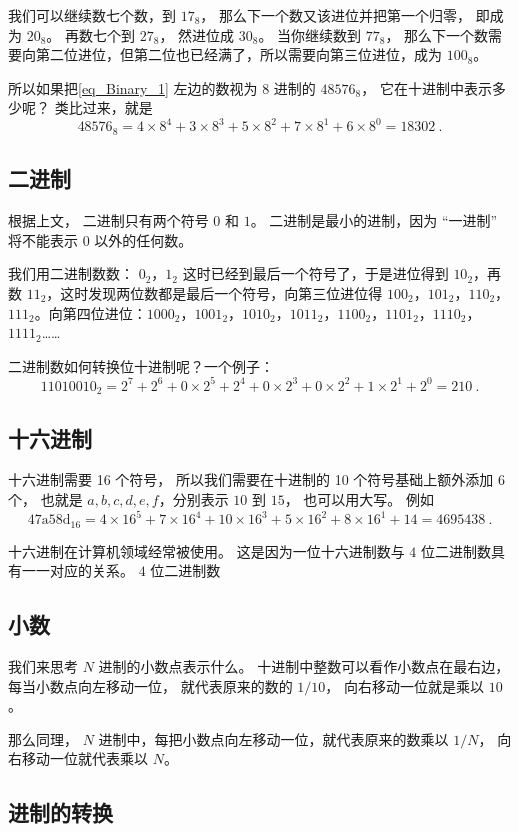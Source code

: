 我们可以继续数七个数，到 $17_\text{8}$， 那么下一个数又该进位并把第一个归零， 即成为 $20_\text{8}$。 再数七个到 $27_\text{8}$， 然进位成 $30_\text{8}$。 当你继续数到 $77_\text{8}$， 那么下一个数需要向第二位进位，但第二位也已经满了，所以需要向第三位进位，成为 $100_\text{8}$。

所以如果把\autoref{eq_Binary_1} 左边的数视为 $8$ 进制的 $48576_\text{8}$， 它在十进制中表示多少呢？ 类比过来，就是
\begin{equation}
48576_\text{8} = 4\times 8^{4} + 3\times 8^{3} + 5\times 8^{2} + 7\times 8^1 + 6\times 8^0 = 18302~.
\end{equation}

\subsection{二进制}
根据上文， 二进制只有两个符号 $0$ 和 $1$。 二进制是最小的进制，因为 “一进制” 将不能表示 $0$ 以外的任何数。

我们用二进制数数： $0_\text{2}$，$1_\text{2}$ 这时已经到最后一个符号了，于是进位得到 $10_\text{2}$，再数 $11_\text{2}$，这时发现两位数都是最后一个符号，向第三位进位得 $100_\text{2}$，$101_\text{2}$，$110_\text{2}$，$111_\text{2}$。向第四位进位：$1000_\text{2}$，$1001_\text{2}$，$1010_\text{2}$，$1011_\text{2}$，$1100_\text{2}$，$1101_\text{2}$，$1110_\text{2}$，$1111_\text{2}$……

二进制数如何转换位十进制呢？一个例子：
\begin{equation}
11010010_\text{2} = 2^7 + 2^6 + 0\times 2^5 + 2^4 + 0\times 2^3 + 0 \times 2^2 + 1\times 2^1 + 2^0 = 210~.
\end{equation}


\subsection{十六进制}
十六进制需要 16 个符号， 所以我们需要在十进制的 10 个符号基础上额外添加 6 个， 也就是 $a,b,c,d,e,f$，分别表示 $10$ 到 $15$， 也可以用大写。 例如
\begin{equation}
\mathrm{47a58d}_\text{16} = 4\times 16^5 + 7\times 16^4 + 10\times 16^3 + 5\times 16^2 + 8 \times 16^1 + 14 = 4695438~.
\end{equation}

十六进制在计算机领域经常被使用。 这是因为一位十六进制数与 $4$ 位二进制数具有一一对应的关系。 $4$ 位二进制数 

\subsection{小数}
我们来思考 $N$ 进制的小数点表示什么。 十进制中整数可以看作小数点在最右边， 每当小数点向左移动一位， 就代表原来的数的 $1/10$， 向右移动一位就是乘以 $10$。

那么同理， $N$ 进制中，每把小数点向左移动一位，就代表原来的数乘以 $1/N$， 向右移动一位就代表乘以 $N$。

\subsection{进制的转换}
